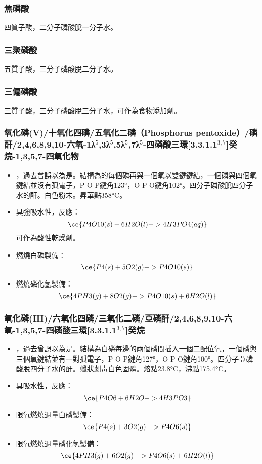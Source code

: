 \documentclass[a4paper,12pt]{report}
\begin{document}
\subsubsection{焦磷酸}
四質子酸，二分子磷酸脫一分子水。
\subsubsection{三聚磷酸}
五質子酸，三分子磷酸脫二分子水。
\subsubsection{三偏磷酸}
三質子酸，三分子磷酸脫三分子水，可作為食物添加劑。
\subsubsection{氧化磷(V)/十氧化四磷/五氧化二磷（Phosphorus pentoxide）/磷酐/2,4,6,8,9,10-六氧-1λ$^5$,3λ$^5$,5λ$^5$,7λ$^5$-四磷酸三環[3.3.1.1$^{3,7}$]癸烷-1,3,5,7-四氧化物}
\begin{itemize}
\item {}，過去曾誤以為是。結構為的每個磷再與一個氧以雙鍵鍵結，一個磷與四個氧鍵結並沒有孤電子，P-O-P鍵角123°，O-P-O鍵角102°。四分子磷酸脫四分子水的酐。白色粉末。昇華點358°C。
\item 具強吸水性，反應：
\[\ce{P4O10(s) + 6H2O(l) -> 4H3PO4(aq)}\]
可作為酸性乾燥劑。
\item 燃燒白磷製備：
\[\ce{P4(s) + 5O2(g) -> P4O10(s)}\]
\item 燃燒磷化氫製備：
\[\ce{4PH3(g) + 8O2(g) -> P4O10(s) + 6H2O(l)}\]
\end{itemize}
\subsubsection{氧化磷(III)/六氧化四磷/三氧化二磷/亞磷酐/2,4,6,8,9,10-六氧-1,3,5,7-四磷酸三環[3.3.1.1$^{3,7}$]癸烷}
\begin{itemize}
\item {}，過去曾誤以為是。結構為白磷每邊的兩個磷間插入一個二配位氧，一個磷與三個氧鍵結並有一對孤電子，P-O-P鍵角127°，O-P-O鍵角100°。四分子亞磷酸脫四分子水的酐。蠟狀劇毒白色固體。熔點23.8°C，沸點175.4°C。
\item 具吸水性，反應：
\[\ce{P4O6 + 6H2O -> 4H3PO3}\]
\item 限氧燃燒過量白磷製備：
\[\ce{P4(s) + 3O2(g) -> P4O6(s)}\]
\item 限氧燃燒過量磷化氫製備：
\[\ce{4PH3(g) + 6O2(g) -> P4O6(s) + 6H2O(l)}\]
\end{itemize}
\end{document}
